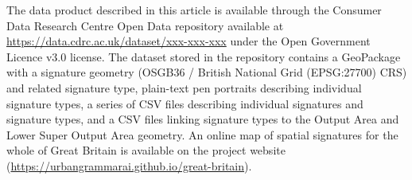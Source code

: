
The data product described in this article is available through the Consumer Data
Research Centre Open Data repository available at
\hyperlink{https://data.cdrc.ac.uk/dataset/xxx-xxx-xxx}{https://data.cdrc.ac.uk/dataset/xxx-xxx-xxx}
under the Open Government Licence v3.0 license. The dataset stored in the repository
contains a GeoPackage with a signature geometry (OSGB36 / British National Grid
(EPSG:27700) CRS) and related signature type, plain-text pen portraits describing individual
signature types, a series of CSV files describing individual signatures and signature
types, and a CSV files linking signature types to the Output Area and Lower Super Output Area geometry. An online map
of spatial signatures for the whole of Great Britain is available on the project website
(\hyperlink{https://urbangrammarai.github.io/great-britain}{https://urbangrammarai.github.io/great-britain}).